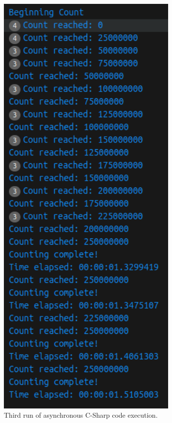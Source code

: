 \documentclass[12pt,a4paper]{article}
\begin{document}
\begin{figure}[htbp]
    \centering
    \includegraphics[width=0.8\textwidth]{../async_records/results_cs/result_3.png}
    \caption{Third run of asynchronous C-Sharp code execution.}
    \label{fig:C-Sharp-async-runtime-3}
\end{figure}
\end{document}
